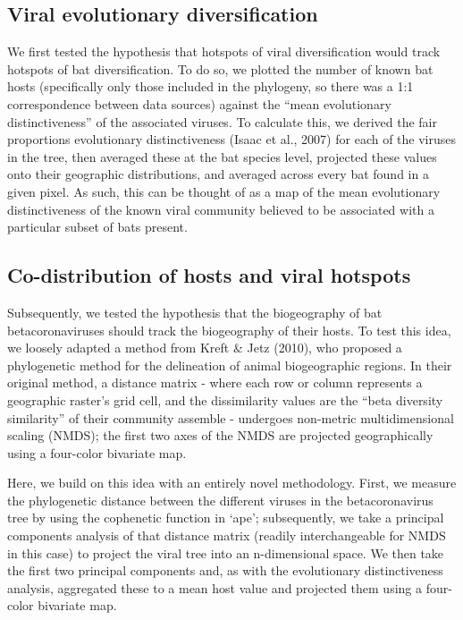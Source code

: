 \documentclass[10pt,oneside]{article}
\begin{document}
\hypertarget{viral-evolutionary-diversification}{%
\subsection{Viral evolutionary
diversification}\label{viral-evolutionary-diversification}}

We first tested the hypothesis that hotspots of viral diversification
would track hotspots of bat diversification. To do so, we plotted the
number of known bat hosts (specifically only those included in the
phylogeny, so there was a 1:1 correspondence between data sources)
against the ``mean evolutionary distinctiveness'' of the associated
viruses. To calculate this, we derived the fair proportions evolutionary
distinctiveness (Isaac et al., 2007) for each of the viruses in the
tree, then averaged these at the bat species level, projected these
values onto their geographic distributions, and averaged across every
bat found in a given pixel. As such, this can be thought of as a map of
the mean evolutionary distinctiveness of the known viral community
believed to be associated with a particular subset of bats present.

\hypertarget{co-distribution-of-hosts-and-viral-hotspots}{%
\subsection{Co-distribution of hosts and viral
hotspots}\label{co-distribution-of-hosts-and-viral-hotspots}}

Subsequently, we tested the hypothesis that the biogeography of bat
betacoronaviruses should track the biogeography of their hosts. To test
this idea, we loosely adapted a method from Kreft \& Jetz (2010), who
proposed a phylogenetic method for the delineation of animal
biogeographic regions. In their original method, a distance matrix -
where each row or column represents a geographic raster's grid cell, and
the dissimilarity values are the ``beta diversity similarity'' of their
community assemble - undergoes non-metric multidimensional scaling
(NMDS); the first two axes of the NMDS are projected geographically
using a four-color bivariate map.

Here, we build on this idea with an entirely novel methodology. First,
we measure the phylogenetic distance between the different viruses in
the betacoronavirus tree by using the cophenetic function in `ape';
subsequently, we take a principal components analysis of that distance
matrix (readily interchangeable for NMDS in this case) to project the
viral tree into an n-dimensional space. We then take the first two
principal components and, as with the evolutionary distinctiveness
analysis, aggregated these to a mean host value and projected them using
a four-color bivariate map.
\end{document}
